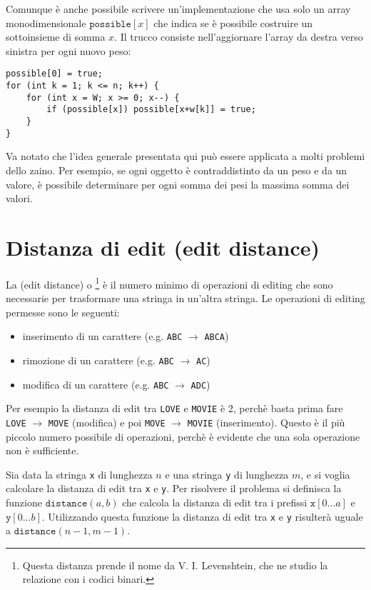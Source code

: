 Comunque è anche possibile scrivere un'implementazione
che usa solo un array monodimensionale $\texttt{possible}[x]$
che indica se è possibile costruire un sottoinsieme di somma $x$.
Il trucco consiste nell'aggiornare l'array da destra verso sinistra
per ogni nuovo peso:
\begin{lstlisting}
possible[0] = true;
for (int k = 1; k <= n; k++) {
    for (int x = W; x >= 0; x--) {
        if (possible[x]) possible[x+w[k]] = true;
    }
}
\end{lstlisting}

Va notato che l'idea generale presentata qui può
essere applicata a molti problemi dello zaino.
Per esempio, se ogni oggetto è contraddistinto da un peso e da un valore,
è possibile determinare per ogni somma dei pesi la massima
somma dei valori.

\section{Distanza di edit (edit distance)}



La (edit distance) o \footnote{Questa distanza prende il 
nome da V. I. Levenshtein, che ne studio la relazione con i codici binari\cite{lev66}.}
è il numero minimo di operazioni di editing
che sono necessarie per trasformare una stringa in un'altra stringa.
Le operazioni di editing permesse sono le seguenti:
\begin{itemize}
\item inserimento di un carattere (e.g. \texttt{ABC} $\rightarrow$ \texttt{ABCA})
\item rimozione di un carattere (e.g. \texttt{ABC} $\rightarrow$ \texttt{AC})
\item modifica di un carattere (e.g. \texttt{ABC} $\rightarrow$ \texttt{ADC})
\end{itemize}

Per esempio la distanza di edit tra
\texttt{LOVE} e \texttt{MOVIE} è 2,
perchè basta prima fare
 \texttt{LOVE} $\rightarrow$ \texttt{MOVE}
(modifica) e poi
\texttt{MOVE} $\rightarrow$ \texttt{MOVIE}
(inserimento).
Questo è il più piccolo numero possibile di operazioni,
perchè è evidente che una sola operazione non è sufficiente.

Sia data la stringa \texttt{x}
di lunghezza $n$ e una stringa \texttt{y} di lunghezza $m$,
e si voglia calcolare la distanza di edit tra
\texttt{x} e \texttt{y}.
Per risolvere il problema si definisca la funzione
$\texttt{distance}(a,b)$ che calcola la distanza di edit
tra i prefissi
$\texttt{x}[0 \ldots a]$ e $\texttt{y}[0 \ldots b]$.
Utilizzando questa funzione la distanza di edit
tra \texttt{x} e \texttt{y} risulterà uguale a $\texttt{distance}(n-1,m-1)$.


